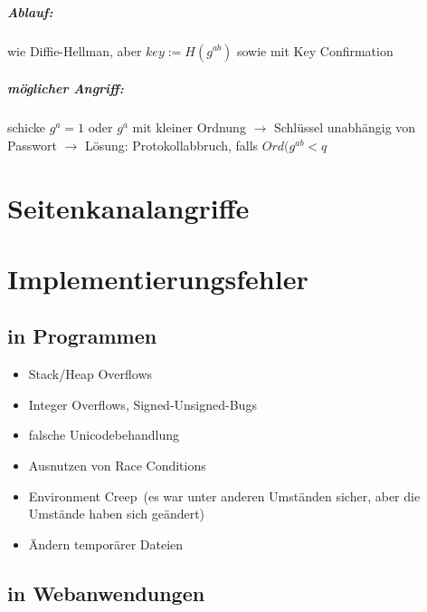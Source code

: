 \documentclass[a4paper,twoside,DIV15,BCOR12mm]{scrbook}
\begin{document}
\paragraph{Ablauf:} wie Diffie-Hellman, aber $key := H(g^{ab})$ sowie mit Key Confirmation\\ 


\paragraph{möglicher Angriff:} schicke $g^a =1$ oder $g^a$ mit kleiner Ordnung $\rightarrow$ Schlüssel unabhängig von Passwort $\rightarrow$ Lösung: Protokollabbruch, falls $Ord(g^{ab} < q$


\chapter{Seitenkanalangriffe}



\chapter{Implementierungsfehler}

\section{in Programmen}

\begin{itemize}
	\item Stack/Heap Overflows
	\item Integer Overflows, Signed-Unsigned-Bugs
	\item falsche Unicodebehandlung
	\item Ausnutzen von Race Conditions
	\item \glqq Environment Creep\grqq\ (es war unter anderen Umständen sicher, aber die Umstände haben sich geändert)
	\item Ändern temporärer Dateien
\end{itemize}

\section{in Webanwendungen}
\end{document}
